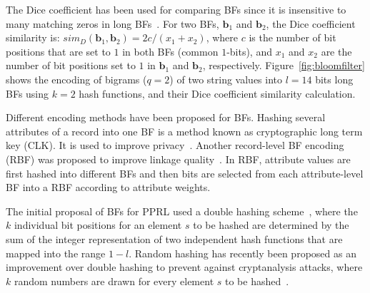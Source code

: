 \documentclass{llncs}
\begin{document}

The Dice coefficient has been used for comparing BFs since it is
insensitive to many matching zeros
in long BFs~\cite{Sch09}. 
%
For two BFs, $\mathbf{b}_1$ and $\mathbf{b}_2$, the Dice coefficient
similarity is: $sim_D(\mathbf{b}_1, \mathbf{b}_2) = 2  c / (x_1 +
x_2)$,
where $c$ is the number of bit positions that are set to $1$ in both
BFs (common $1$-bits), and $x_1$ and $x_2$ are the number of bit
positions set to $1$ in $\mathbf{b}_1$ and $\mathbf{b}_2$,
respectively.
%
Figure~\ref{fig:bloomfilter} shows the encoding of bigrams ($q=2$)
of two string values into $l=14$ bits long BFs using $k=2$ hash
functions, and their Dice coefficient similarity calculation.

Different encoding methods have been proposed for BFs. Hashing
several attributes of a record into one BF is a method known as
cryptographic long term key (CLK). It is used to improve
privacy~\cite{Sch11}. Another record-level BF encoding (RBF) was
proposed to improve linkage quality~\cite{Dur14}. In RBF,
attribute values are first hashed into different BFs and then bits
are selected from each attribute-level BF into a RBF according to
attribute weights.

The initial proposal of BFs for PPRL used a double hashing
scheme~\cite{Sch09}, where the $k$ individual bit positions for an
element $s$ to be hashed are determined by the sum of the integer
representation of two independent hash functions that are mapped into
the range $1-l$. Random hashing has recently been proposed as an
improvement over double hashing to prevent against cryptanalysis
attacks, where $k$ random numbers are drawn for every element $s$ to
be hashed~\cite{Nie14,Sch16}.


\smallskip

\end{document}
